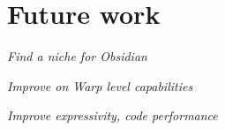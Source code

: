 \documentclass[a4paper]{book}
\begin{document}




\FloatBarrier
%
%
\section{Future work} 

\noindent\emph{Find a niche for Obsidian} 

\noindent\emph{Improve on Warp level capabilities} 

\noindent\emph{Improve expressivity, code performance} 

%
%
\end{document}
